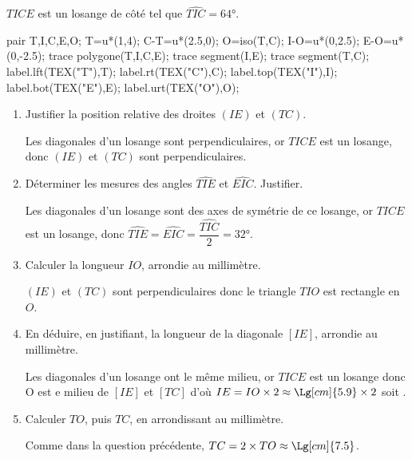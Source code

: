 \begin{corrige}
    $TICE$ est un losange de côté  tel que $\widehat{TIC}=\ang{64}$.

    \begin{Geometrie}
        pair T,I,C,E,O;
        T=u*(1,4);
        C-T=u*(2.5,0);
        O=iso(T,C);
        I-O=u*(0,2.5);
        E-O=u*(0,-2.5);
        trace polygone(T,I,C,E);
        trace segment(I,E);
        trace segment(T,C);
        label.lft(TEX("T"),T);
        label.rt(TEX("C"),C);
        label.top(TEX("I"),I);
        label.bot(TEX("E"),E);
        label.urt(TEX("O"),O);
    \end{Geometrie}
    \begin{enumerate}
        \item Justifier la position relative des droites $(IE)$ et $(TC)$.
        
        {\color{red}Les diagonales d'un losange sont perpendiculaires, or $TICE$ est un losange, donc $(IE)$ et $(TC)$ sont perpendiculaires.}
        \item Déterminer les mesures des angles $\widehat{TIE}$ et $\widehat{EIC}$. Justifier.
        
        {\color{red}Les diagonales d'un losange sont des axes de symétrie de ce losange, or $TICE$ est un losange, donc $\widehat{TIE}=\widehat{EIC}=\dfrac{\widehat{TIC}}{2}=\ang{32}$.}
        \item Calculer la longueur $IO$, arrondie au millimètre.
        
        {\color{red}$(IE)$ et $(TC)$ sont perpendiculaires donc le triangle $TIO$ est rectangle en $O$.
        
        }
        \item En déduire, en justifiant, la longueur de la diagonale $[IE]$, arrondie au millimètre.
        
        {\color{red}Les diagonales d'un losange ont le même milieu, or $TICE$ est un losange donc O est e milieu de $[IE]$ et $[TC]$ d'où $IE=IO\times 2\approx\Lg[cm]{5.9}\times 2$ soit .}
        \item Calculer $TO$, puis $TC$, en arrondissant au millimètre.
        
        {\color{red}
        
        Comme dans la question précédente, $TC=2\times TO\approx\Lg[cm]{7.5}$.
        }
    \end{enumerate}
\end{corrige}

